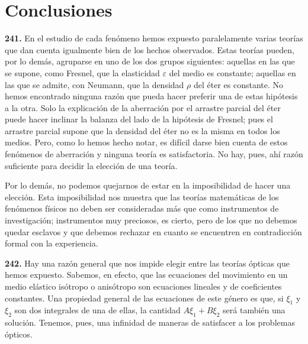 \chapter*{Conclusiones}

\noindent\textbf{241.} En el estudio de cada fenómeno hemos expuesto
paralelamente varias teorías que dan cuenta igualmente bien de los hechos
observados. Estas teorías pueden, por lo demás, agruparse en uno de los
dos grupos siguientes: aquellas en las que se supone, como Fresnel, que la
elasticidad $\varepsilon$ del medio es constante; aquellas en las que se
admite, con Neumann, que la densidad $\rho$ del éter es constante. No
hemos encontrado ninguna razón que pueda hacer preferir una de estas
hipótesis a la otra. Solo la explicación de la aberración por el arrastre
parcial del éter puede hacer inclinar la balanza del lado de la hipótesis
de Fresnel; pues el arrastre parcial supone que la densidad del éter no es
la misma en todos los medios. Pero, como lo hemos hecho notar, es difícil
darse bien cuenta de estos fenómenos de aberración y ninguna teoría es
satisfactoria. No hay, pues, ahí razón suficiente para decidir la elección
de una teoría.

Por lo demás, no podemos quejarnos de estar en la imposibilidad de hacer
una elección. Esta imposibilidad nos muestra que las teorías matemáticas de
los fenómenos físicos no deben ser consideradas más que como instrumentos
de investigación; instrumentos muy preciosos, es cierto, pero de los que no
debemos quedar esclavos y que debemos rechazar en cuanto se encuentren en
contradicción formal con la experiencia.

\noindent\textbf{242.} Hay una razón general que nos impide elegir entre
las teorías ópticas que hemos expuesto. Sabemos, en efecto, que las
ecuaciones del movimiento en un medio elástico isótropo o anisótropo son
ecuaciones lineales y de coeficientes constantes. Una propiedad general de
las ecuaciones de este género es que, si $\xi_1$ y $\xi_2$ son dos
integrales de una de ellas, la cantidad $A\xi_1+B\xi_2$ será también una
solución. Tenemos, pues, una infinidad de maneras de satisfacer a los
problemas ópticos.

